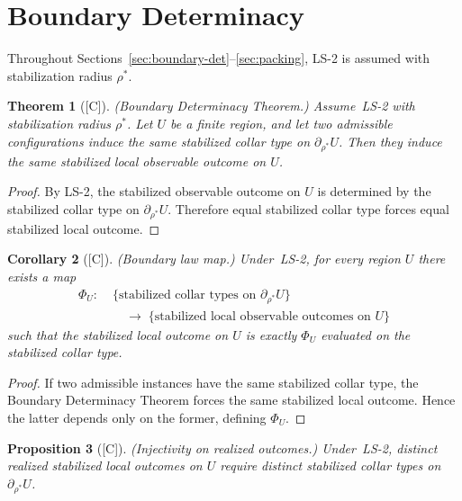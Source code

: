 \documentclass[12pt,oneside]{amsbook}
\theoremstyle{plain}
\newtheorem{theorem}{Theorem}[section]
\newtheorem{proposition}[theorem]{Proposition}
\newtheorem{corollary}[theorem]{Corollary}
\theoremstyle{definition}
\theoremstyle{remark}
\newcommand{\status}[1]{\textup{[#1]}}
\begin{document}
\section{Boundary Determinacy}

Throughout Sections~\ref{sec:boundary-det}--\ref{sec:packing}, LS-2
is assumed with stabilization radius $\rho^*$.

\begin{theorem}[\status{C}]\label{thm:boundary-det}
\textup{(Boundary Determinacy Theorem.)}  Assume~LS-2 with
stabilization radius $\rho^*$.  Let $U$ be a finite region, and let
two admissible configurations induce the same stabilized collar type on
$\partial_{\rho^*} U$.  Then they induce the same stabilized local
observable outcome on $U$.
\end{theorem}
\label{sec:boundary-det}

\begin{proof}
By LS-2, the stabilized observable outcome on $U$ is determined by the
stabilized collar type on $\partial_{\rho^*} U$.  Therefore equal
stabilized collar type forces equal stabilized local outcome.
\end{proof}

\begin{corollary}[\status{C}]\label{cor:boundary-law-map}
\textup{(Boundary law map.)}  Under~LS-2, for every region $U$ there
exists a map
\begin{align*}
  \Phi_U:\; &\{\text{stabilized collar types on } \partial_{\rho^*} U\}\\
  &\quad\longrightarrow\;
  \{\text{stabilized local observable outcomes on } U\}
\end{align*}
such that the stabilized local outcome on $U$ is exactly $\Phi_U$
evaluated on the stabilized collar type.
\end{corollary}

\begin{proof}
If two admissible instances have the same stabilized collar type, the
Boundary Determinacy Theorem forces the same stabilized local outcome.
Hence the latter depends only on the former, defining $\Phi_U$.
\end{proof}

\begin{proposition}[\status{C}]\label{prop:injection}
\textup{(Injectivity on realized outcomes.)}  Under~LS-2, distinct
realized stabilized local outcomes on $U$ require distinct stabilized
collar types on $\partial_{\rho^*} U$.
\end{proposition}
\end{document}

